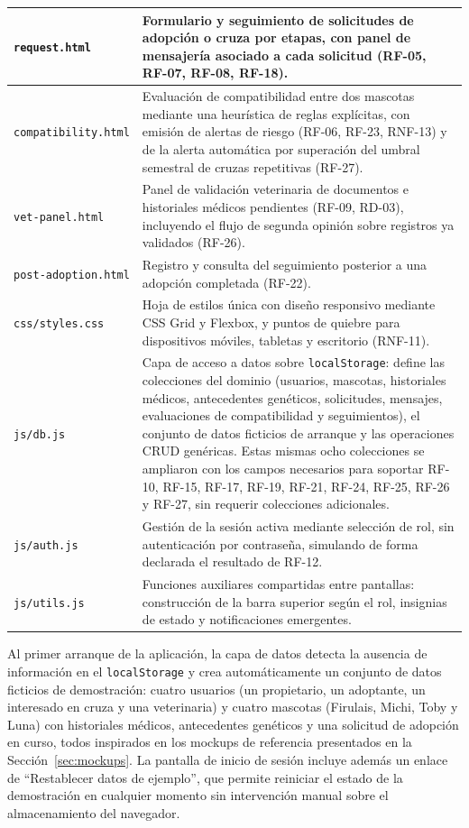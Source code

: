 \documentclass[journal,onecolumn]{IEEEtran}
\begin{document}
\begin{longtable}{@{}p{4.2cm} p{10.6cm}@{}}
		\hline
		\texttt{request.html} & Formulario y seguimiento de solicitudes de adopción o cruza por etapas, con panel de mensajería asociado a cada solicitud (RF-05, RF-07, RF-08, RF-18). \\
		\hline
		\texttt{compatibility.html} & Evaluación de compatibilidad entre dos mascotas mediante una heurística de reglas explícitas, con emisión de alertas de riesgo (RF-06, RF-23, RNF-13) y de la alerta automática por superación del umbral semestral de cruzas repetitivas (RF-27). \\
		\hline
		\texttt{vet-panel.html} & Panel de validación veterinaria de documentos e historiales médicos pendientes (RF-09, RD-03), incluyendo el flujo de segunda opinión sobre registros ya validados (RF-26). \\
		\hline
		\texttt{post-adoption.html} & Registro y consulta del seguimiento posterior a una adopción completada (RF-22). \\
		\hline
		\texttt{css/styles.css} & Hoja de estilos única con diseño responsivo mediante CSS Grid y Flexbox, y puntos de quiebre para dispositivos móviles, tabletas y escritorio (RNF-11). \\
		\hline
		\texttt{js/db.js} & Capa de acceso a datos sobre \texttt{localStorage}: define las colecciones del dominio (usuarios, mascotas, historiales médicos, antecedentes genéticos, solicitudes, mensajes, evaluaciones de compatibilidad y seguimientos), el conjunto de datos ficticios de arranque y las operaciones CRUD genéricas. Estas mismas ocho colecciones se ampliaron con los campos necesarios para soportar RF-10, RF-15, RF-17, RF-19, RF-21, RF-24, RF-25, RF-26 y RF-27, sin requerir colecciones adicionales. \\
		\hline
		\texttt{js/auth.js} & Gestión de la sesión activa mediante selección de rol, sin autenticación por contraseña, simulando de forma declarada el resultado de RF-12. \\
		\hline
		\texttt{js/utils.js} & Funciones auxiliares compartidas entre pantallas: construcción de la barra superior según el rol, insignias de estado y notificaciones emergentes. \\
	\end{longtable}
	
	Al primer arranque de la aplicación, la capa de datos detecta la ausencia de
	información en el \texttt{localStorage} y crea automáticamente un conjunto
	de datos ficticios de demostración: cuatro usuarios (un propietario, un
	adoptante, un interesado en cruza y una veterinaria) y cuatro mascotas
	(Firulais, Michi, Toby y Luna) con historiales médicos, antecedentes
	genéticos y una solicitud de adopción en curso, todos inspirados en los
	mockups de referencia presentados en la
	Sección~\ref{sec:mockups}. La pantalla de inicio de sesión incluye
	además un enlace de \enquote{Restablecer datos de ejemplo}, que permite
	reiniciar el estado de la demostración en cualquier momento sin intervención
	manual sobre el almacenamiento del navegador.
	
\end{document}
